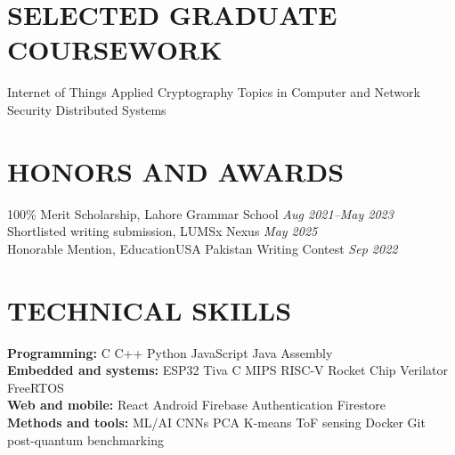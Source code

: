 \documentclass[9pt]{article}
\begin{document}
\section*{SELECTED GRADUATE COURSEWORK}
Internet of Things \textperiodcentered{} Applied Cryptography \textperiodcentered{} Topics in Computer and Network Security \textperiodcentered{} Distributed Systems
\section*{HONORS AND AWARDS}
100\% Merit Scholarship, Lahore Grammar School \textperiodcentered{} {\itshape Aug 2021--May 2023}\\
Shortlisted writing submission, LUMSx Nexus \textperiodcentered{} {\itshape May 2025}\\
Honorable Mention, EducationUSA Pakistan Writing Contest \textperiodcentered{} {\itshape Sep 2022}
\section*{TECHNICAL SKILLS}
\textbf{Programming:} C \textperiodcentered{} C++ \textperiodcentered{} Python \textperiodcentered{} JavaScript \textperiodcentered{} Java \textperiodcentered{} Assembly\\
\textbf{Embedded and systems:} ESP32 \textperiodcentered{} Tiva C \textperiodcentered{} MIPS \textperiodcentered{} RISC-V \textperiodcentered{} Rocket Chip \textperiodcentered{} Verilator \textperiodcentered{} FreeRTOS\\
\textbf{Web and mobile:} React \textperiodcentered{} Android \textperiodcentered{} Firebase Authentication \textperiodcentered{} Firestore\\
\textbf{Methods and tools:} ML/AI \textperiodcentered{} CNNs \textperiodcentered{} PCA \textperiodcentered{} K-means \textperiodcentered{} ToF sensing \textperiodcentered{} Docker \textperiodcentered{} Git \textperiodcentered{} post-quantum benchmarking
\end{document}
